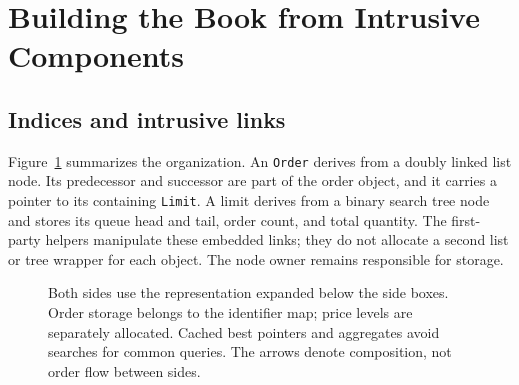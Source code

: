 \documentclass[10pt,letterpaper,twocolumn]{article}
\newcommand{\code}[1]{\texttt{#1}}
\begin{document}
\section{Building the Book from Intrusive Components}
\subsection{Indices and intrusive links}
Figure~\ref{fig:architecture} summarizes the organization. An \code{Order}
derives from a doubly linked list node. Its predecessor and successor are
part of the order object, and it carries a pointer to its containing
\code{Limit}. A limit derives from a binary search tree node and stores its
queue head and tail, order count, and total quantity. The first-party helpers
manipulate these embedded links; they do not allocate a second list or tree
wrapper for each object. The node owner remains responsible for storage.

\begin{figure}[t]
\centering
{}
\caption{Both sides use the representation expanded below the side boxes.
Order storage belongs to the identifier map; price levels are separately
allocated. Cached best pointers and aggregates avoid searches for common
queries. The arrows denote composition, not order flow between sides.}
\label{fig:architecture}
\end{figure}
\end{document}
